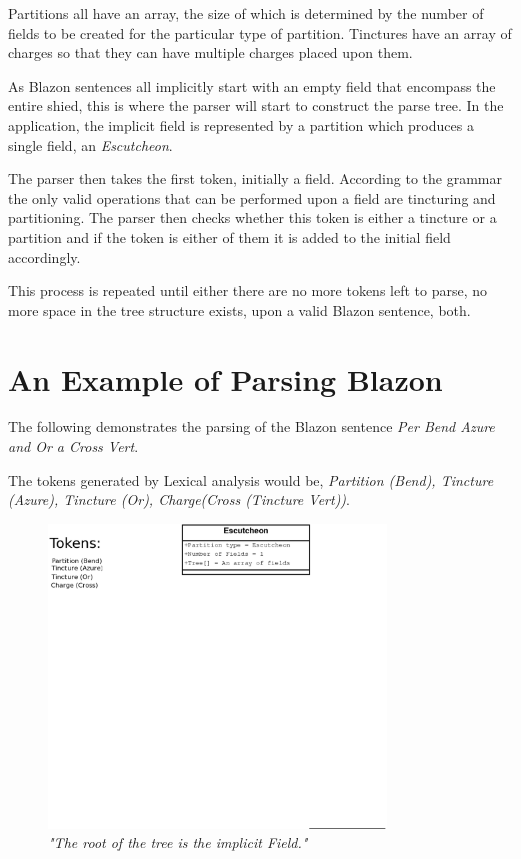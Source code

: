Partitions all have an array, the size of which is determined by the number of fields to be created for the particular type of partition.  Tinctures have an array of charges so that they can have multiple charges placed upon them. 

As Blazon sentences all implicitly start with an empty field that encompass the entire shied, this is where the parser will start to construct the  parse tree.  In the application, the implicit field is represented by a partition which produces a single field, an \emph{Escutcheon}. 

The parser then takes the first token, initially a field.  According to the grammar the only valid operations that can be performed upon a field are tincturing and partitioning. The parser then checks whether this token is either a tincture or a partition and if the token is either of them it is added to the initial field accordingly.  

This process is repeated until either there are no more tokens left to parse, no more space in the tree structure exists, upon a valid Blazon sentence, both. 



\section{An Example of Parsing Blazon}


The following demonstrates the parsing of the Blazon sentence \emph{Per Bend Azure and Or a Cross Vert}.  

The tokens generated by Lexical analysis would be, \emph{Partition (Bend), Tincture (Azure), Tincture (Or), Charge(Cross (Tincture Vert))}.


\begin{figure}[H]
  \centering
    \includegraphics[width=0.8\textwidth]{parsing/images/Parsing5.eps}
  \caption{\emph{"The root of the tree is the implicit Field."}}
  
\end{figure}


